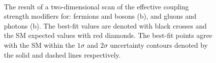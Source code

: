 \begin{figure}[ht!]
\centering
{}\\
\caption{The result of a two-dimensional \DNLL scan of the effective coupling strength modifiers for: fermions and bosons (b), and gluons and photons (b). The best-fit values are denoted with black crosses and the SM expected values with red diamonds. The best-fit points agree with the SM within the $1\sigma$ and $2\sigma$ uncertainty contours denoted by the solid and dashed lines respectively.}

\label{fig:statandresults:kappa_plots}

\end{figure}
